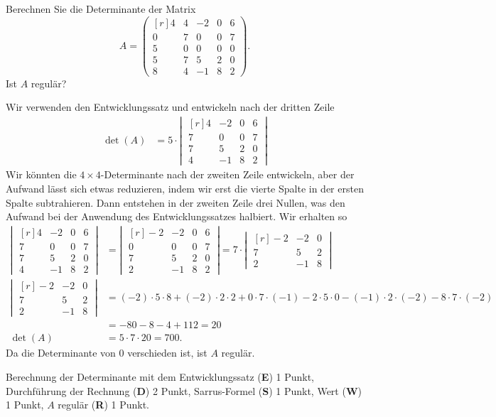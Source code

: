 Berechnen Sie die Determinante der Matrix
\[
A =
\begin{pmatrix*}[r]
   4 & 4 &-2 & 0 & 6\\
   0 & 7 & 0 & 0 & 7\\
   5 & 0 & 0 & 0 & 0\\
   5 & 7 & 5 & 2 & 0\\
   8 & 4 &-1 & 8 & 2
\end{pmatrix*}.
\]
Ist $A$ regulär?

\begin{loesung}
Wir verwenden den Entwicklungssatz und entwickeln nach der dritten Zeile
\begin{align*}
\det(A)
&=
5\cdot
\left|\;\begin{matrix*}[r]
  4 &-2 & 0 & 6\\
  7 & 0 & 0 & 7\\
  7 & 5 & 2 & 0\\
  4 &-1 & 8 & 2
\end{matrix*}\;\right|
\end{align*}
Wir könnten die $4\times 4$-Determinante nach der zweiten Zeile entwickeln,
aber der Aufwand lässt sich etwas reduzieren, indem wir erst die vierte Spalte
in der ersten Spalte subtrahieren. 
Dann entstehen in der zweiten Zeile drei Nullen, was den Aufwand bei
der Anwendung des Entwicklungssatzes halbiert.
Wir erhalten so
\begin{align*}
\left|\;\begin{matrix*}[r]
  4 &-2 & 0 & 6\\
  7 & 0 & 0 & 7\\
  7 & 5 & 2 & 0\\
  4 &-1 & 8 & 2
\end{matrix*}\;\right|
&=
\left|\;\begin{matrix*}[r]
 -2 &-2 & 0 & 6\\
  0 & 0 & 0 & 7\\
  7 & 5 & 2 & 0\\
  2 &-1 & 8 & 2
\end{matrix*}\;\right|
=
7\cdot
\left|\;\begin{matrix*}[r]
 -2 &-2 & 0\\
  7 & 5 & 2\\
  2 &-1 & 8
\end{matrix*}\;\right|
\\
\left|\;\begin{matrix*}[r]
 -2 &-2 & 0\\
  7 & 5 & 2\\
  2 &-1 & 8
\end{matrix*}\;\right|
&=
(-2)\cdot 5\cdot 8
+
(-2)\cdot 2 \cdot 2
+
0\cdot 7 \cdot (-1)
-
2\cdot 5\cdot 0
-
(-1)\cdot 2 \cdot (-2)
-
8\cdot 7\cdot (-2)
\\
&=
-80 -8-4+112
=
20
\\
\det(A)
&=
5\cdot 7 \cdot 20
= 
700.
\end{align*}
Da die Determinante von $0$ verschieden ist, ist $A$ regulär.
\end{loesung}

\begin{bewertung}
Berechnung der Determinante mit dem Entwicklungssatz ({\bf E}) 1 Punkt,
Durchführung der Rechnung ({\bf D}) 2 Punkt,
Sarrus-Formel ({\bf S}) 1 Punkt,
Wert ({\bf W}) 1 Punkt,
$A$ regulär ({\bf R}) 1 Punkt.
\end{bewertung}




